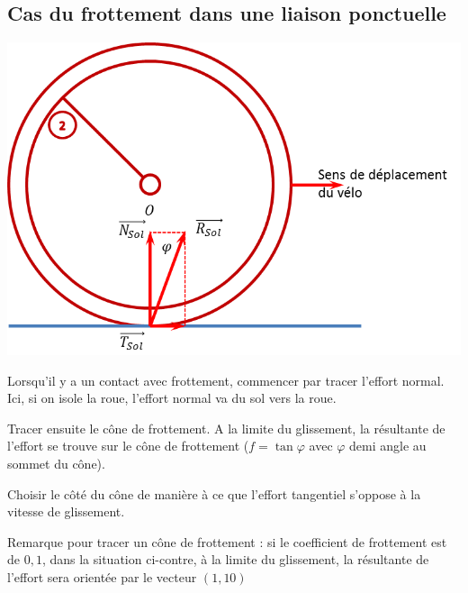 \documentclass[10pt]{article}
\begin{document}
\subsection{Cas du frottement dans une liaison ponctuelle}
\begin{minipage}[c]{.3\linewidth}
\begin{center}
\includegraphics[width=.95\textwidth]{images/2_frott}
\end{center}
\end{minipage}
\hfill
\begin{minipage}[c]{.65\linewidth}
Lorsqu'il y a un contact avec frottement, commencer par tracer l'effort normal. Ici, si on isole la roue, l'effort normal va du sol vers la roue. 

Tracer ensuite le cône de frottement. A la limite du glissement, la résultante de l'effort se trouve sur le cône de frottement ($f=\tan\varphi$ avec $\varphi$ demi angle au sommet du cône). 

Choisir le côté du cône de manière à ce que l'effort tangentiel s'oppose à la vitesse de glissement. 

Remarque pour tracer un cône de frottement : si le coefficient de frottement est de $0,1$, dans la situation ci-contre, à la limite du glissement, la résultante de l'effort sera orientée par le vecteur $(1,10)$
\end{minipage}

\end{document}
